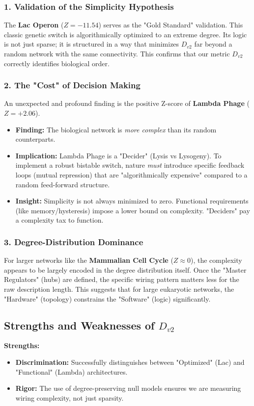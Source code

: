 \documentclass{article}
\begin{document}
\subsubsection{1. Validation of the Simplicity Hypothesis}
The \textbf{Lac Operon} ($Z = -11.54$) serves as the "Gold Standard" validation. This classic genetic switch is algorithmically optimized to an extreme degree. Its logic is not just sparse; it is structured in a way that minimizes $D_{v2}$ far beyond a random network with the same connectivity. This confirms that our metric $D_{v2}$ correctly identifies biological order.

\subsubsection{2. The "Cost" of Decision Making}
An unexpected and profound finding is the positive Z-score of \textbf{Lambda Phage} ($Z = +2.06$).
\begin{itemize}
    \item \textbf{Finding:} The biological network is \textit{more complex} than its random counterparts.
    \item \textbf{Implication:} Lambda Phage is a "Decider" (Lysis vs Lysogeny). To implement a robust bistable switch, nature \textit{must} introduce specific feedback loops (mutual repression) that are "algorithmically expensive" compared to a random feed-forward structure.
    \item \textbf{Insight:} Simplicity is not always minimized to zero. Functional requirements (like memory/hysteresis) impose a lower bound on complexity. "Deciders" pay a complexity tax to function.
\end{itemize}

\subsubsection{3. Degree-Distribution Dominance}
For larger networks like the \textbf{Mammalian Cell Cycle} ($Z \approx 0$), the complexity appears to be largely encoded in the degree distribution itself. Once the "Master Regulators" (hubs) are defined, the specific wiring pattern matters less for the raw description length. This suggests that for large eukaryotic networks, the "Hardware" (topology) constrains the "Software" (logic) significantly.

\subsection{Strengths and Weaknesses of $D_{v2}$}
\textbf{Strengths:}
\begin{itemize}
    \item \textbf{Discrimination:} Successfully distinguishes between "Optimized" (Lac) and "Functional" (Lambda) architectures.
    \item \textbf{Rigor:} The use of degree-preserving null models ensures we are measuring wiring complexity, not just sparsity.
\end{itemize}
\end{document}
